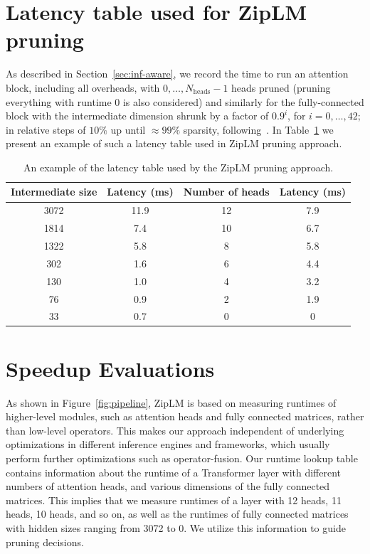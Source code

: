 \documentclass{article}
\theoremstyle{plain}
\theoremstyle{definition}
\theoremstyle{remark}
\begin{document}
\section{Latency table used for ZipLM pruning}
\label{app:latency_table}

As described in Section~\ref{sec:inf-aware}, we record the time to run an attention block, including all \mbox{overheads}, with $0, \dots, N_\text{heads} - 1$ heads pruned (pruning everything with runtime 0 is also considered) and similarly for the fully-connected block with the intermediate dimension shrunk by a factor of $0.9^i$, for $i = 0, \dots, 42$; in relative steps of $10\%$ up until $\approx99\%$ sparsity, following~\cite{frantar2022spdy}. In Table~\ref{tab:latency_table} we present an example of such a latency table used in ZipLM pruning approach.


\begin{table}
    \caption{An example of the latency table used by the ZipLM pruning approach.}
    \label{tab:latency_table}
    \centering
        \begin{tabular}{cc|cc}
        \toprule
        Intermediate size & Latency (ms) & Number of heads & Latency (ms) \\
        \midrule  
            3072 & 11.9	 & 12 & 7.9 \\
            1814 &	7.4	 & 10	& 6.7 \\
            1322 & 5.8	& 8	& 5.8 \\
            302	& 1.6	 & 6	& 4.4 \\
            130	& 1.0	 & 4	& 3.2 \\
            76	& 0.9	 & 2	& 1.9 \\
            33	& 0.7	 & 0	& 0 \\
        \bottomrule
        \end{tabular}
\end{table}

 
\section{Speedup Evaluations}
\label{app:speedups}
As shown in Figure~\ref{fig:pipeline}, ZipLM is based on measuring runtimes of higher-level modules, such as attention heads and fully connected matrices, rather than low-level operators. This makes our approach independent of underlying optimizations in different inference engines and frameworks, which usually perform further optimizations such as operator-fusion. Our runtime lookup table contains information about the runtime of a Transformer layer with different numbers of attention heads, and various dimensions of the fully connected matrices. This implies that we measure runtimes of a layer with 12 heads, 11 heads, 10 heads, and so on, as well as the runtimes of fully connected matrices with hidden sizes ranging from 3072 to 0. We utilize this information to guide pruning decisions.
\end{document}
